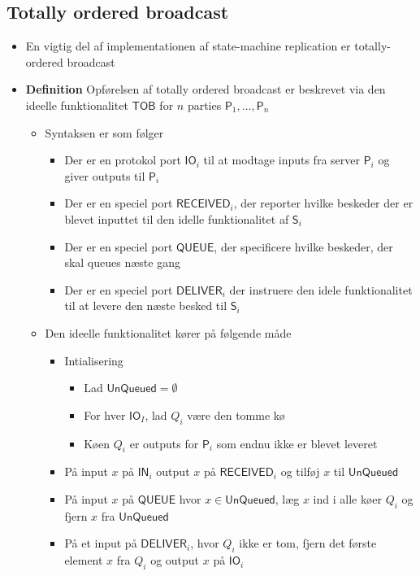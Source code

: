 \documentclass[a4, english]{article}
\begin{document}
\subsection{Totally ordered broadcast}
\begin{itemize}
	\item En vigtig del af implementationen af state-machine replication er totally-ordered broadcast
  \item \textbf{Definition} Opførelsen af totally ordered broadcast er beskrevet via den ideelle funktionalitet $\mathsf{TOB}$ for $n$ parties $\mathsf P_1, \dots, \mathsf P_n$ 
  \begin{itemize}
  	\item Syntaksen er som følger
    \begin{itemize}
    	\item Der er en protokol port $\mathsf{IO}_i$ til at modtage inputs fra server $\mathsf{P}_i$ og giver outputs til $\mathsf{P}_i$ 
  		\item Der er en speciel port $\mathsf{RECEIVED}_i$, der reporter hvilke beskeder der er blevet inputtet til den idelle funktionalitet af $\mathsf{S}_i$
  		\item Der er en speciel port $\mathsf{QUEUE}$, der specificere hvilke beskeder, der skal queues næste gang  
  		\item Der er en speciel port $\mathsf{DELIVER}_i$ der instruere den idele funktionalitet til at levere den næste besked til $\mathsf{S}_i$ 						
    \end{itemize}
    \item Den ideelle funktionalitet kører på følgende måde
    \begin{itemize}
    	\item Intialisering
      \begin{itemize}
      	\item Lad $\mathsf{UnQueued} = \emptyset$
        \item For hver $\mathsf{IO}_I$, lad $Q_i$ være den tomme kø
        \item Køen $Q_i$ er outputs for $\mathsf P_i$ som endnu ikke er blevet leveret
      \end{itemize}
      \item På input $x$ på $\mathsf{IN}_i$ output $x$ på $\mathsf{RECEIVED}_i$ og tilføj $x$ til $\mathsf{UnQueued}$ 
      \item På input $x$ på $\mathsf{QUEUE}$ hvor $x \in \mathsf{UnQueued}$, læg $x$ ind i alle køer $Q_i$ og fjern $x$ fra $\mathsf{UnQueued}$ 
      \item På et input på $\mathsf{DELIVER}_i$, hvor $Q_i$ ikke er tom, fjern det første element $x$ fra $Q_i$ og output $x$ på $\mathsf{IO}_i$ 

\end{itemize}
\end{itemize}
\end{itemize}
\end{document}
